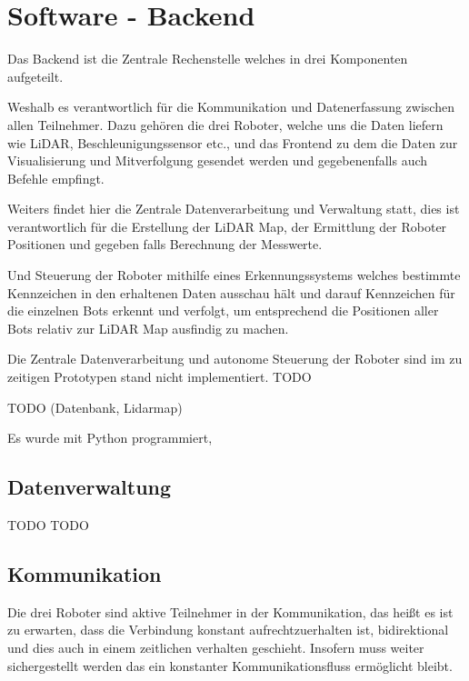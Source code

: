 

\chapter{Software - Backend}
\label{sec:software_backend}
Das Backend ist die Zentrale Rechenstelle welches in drei Komponenten aufgeteilt.

Weshalb es verantwortlich für die Kommunikation und Datenerfassung zwischen allen Teilnehmer. 
Dazu gehören die drei Roboter, welche uns die Daten liefern wie LiDAR, Beschleunigungssensor etc., 
und das Frontend zu dem die Daten zur Visualisierung und Mitverfolgung gesendet werden 
und gegebenenfalls auch Befehle empfingt.

Weiters findet hier die Zentrale Datenverarbeitung und Verwaltung statt, 
dies ist verantwortlich für die Erstellung der LiDAR Map, 
der Ermittlung der Roboter Positionen 
und gegeben falls Berechnung der Messwerte. 

Und Steuerung der Roboter mithilfe eines Erkennungssystems 
welches bestimmte Kennzeichen in den erhaltenen Daten ausschau hält und 
darauf Kennzeichen für die einzelnen Bots erkennt und verfolgt, 
um entsprechend die Positionen aller Bots relativ zur LiDAR Map ausfindig zu machen.

Die Zentrale Datenverarbeitung und autonome Steuerung der Roboter sind 
im zu zeitigen Prototypen stand nicht implementiert.
TODO 

TODO (Datenbank, Lidarmap)

Es wurde mit Python programmiert, 

\section{Datenverwaltung}
\label{subsec:backend_data}
TODO
TODO

\section{Kommunikation}
\label{subsec:Kommunikation}
Die drei Roboter sind aktive Teilnehmer in der Kommunikation, 
das heißt es ist zu erwarten, dass die Verbindung konstant aufrechtzuerhalten ist,
bidirektional und dies auch in einem zeitlichen verhalten geschieht. 
Insofern muss weiter sichergestellt werden das ein konstanter Kommunikationsfluss ermöglicht bleibt.

